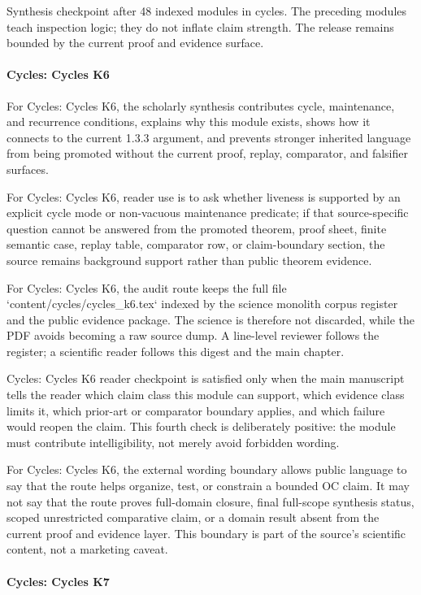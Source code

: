 Synthesis checkpoint after 48 indexed modules in cycles. The preceding modules teach inspection logic; they do not inflate claim strength. The release remains bounded by the current proof and evidence surface.


\paragraph{Cycles: Cycles K6}

For Cycles: Cycles K6, the scholarly synthesis contributes cycle, maintenance, and recurrence conditions, explains why this module exists, shows how it connects to the current 1.3.3 argument, and prevents stronger inherited language from being promoted without the current proof, replay, comparator, and falsifier surfaces.


For Cycles: Cycles K6, reader use is to ask whether liveness is supported by an explicit cycle mode or non-vacuous maintenance predicate; if that source-specific question cannot be answered from the promoted theorem, proof sheet, finite semantic case, replay table, comparator row, or claim-boundary section, the source remains background support rather than public theorem evidence.


For Cycles: Cycles K6, the audit route keeps the full file `content/cycles/cycles\_k6.tex` indexed by the science monolith corpus register and the public evidence package. The science is therefore not discarded, while the PDF avoids becoming a raw source dump. A line-level reviewer follows the register; a scientific reader follows this digest and the main chapter.


Cycles: Cycles K6 reader checkpoint is satisfied only when the main manuscript tells the reader which claim class this module can support, which evidence class limits it, which prior-art or comparator boundary applies, and which failure would reopen the claim. This fourth check is deliberately positive: the module must contribute intelligibility, not merely avoid forbidden wording.


For Cycles: Cycles K6, the external wording boundary allows public language to say that the route helps organize, test, or constrain a bounded OC claim. It may not say that the route proves full-domain closure, final full-scope synthesis status, scoped unrestricted comparative claim, or a domain result absent from the current proof and evidence layer. This boundary is part of the source's scientific content, not a marketing caveat.


\paragraph{Cycles: Cycles K7}

